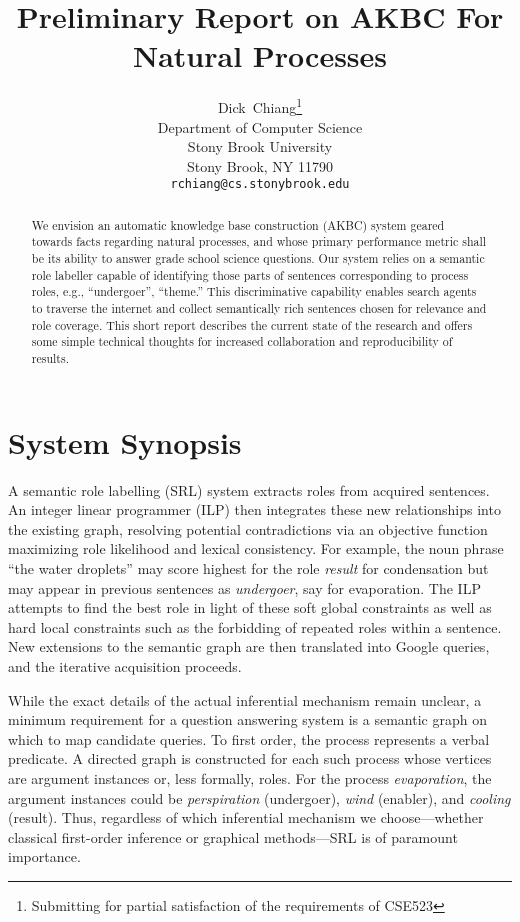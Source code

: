 \documentclass{article} %
\title{Preliminary Report on AKBC For Natural Processes}
\author{
Dick~Chiang\thanks{Submitting for partial satisfaction of the requirements of CSE523}\\
Department of Computer Science\\
Stony Brook University\\
Stony Brook, NY 11790 \\
\texttt{rchiang@cs.stonybrook.edu} \\
}
\begin{document}
\maketitle

\begin{abstract}
We envision an automatic knowledge base construction (AKBC) system geared towards facts regarding natural processes, and whose primary performance metric shall be its ability to answer grade school science questions.  Our system relies on a semantic role labeller capable of identifying those parts of sentences corresponding to process roles, e.g., ``undergoer'', ``theme.''  This discriminative capability enables search agents to traverse the internet and collect semantically rich sentences chosen for relevance and role coverage.  This short report describes the current state of the research and offers some simple technical thoughts for increased collaboration and reproducibility of results.
\end{abstract}

\section{System Synopsis}
A semantic role labelling (SRL) system extracts roles from acquired sentences.  An integer linear programmer (ILP) then integrates these new relationships into the existing graph, resolving potential contradictions via an objective function maximizing role likelihood and lexical consistency.  For example, the noun phrase ``the water droplets'' may score highest for the role {\it result} for condensation but may appear in previous sentences as {\it undergoer}, say for evaporation.   The ILP attempts to find the best role in light of these soft global constraints as well as hard local constraints such as the forbidding of repeated roles within a sentence.  New extensions to the semantic graph are then translated into Google queries, and the iterative acquisition proceeds.

While the exact details of the actual inferential mechanism remain unclear, a minimum requirement for a question answering system is a semantic graph on which to map candidate queries.  To first order, the process represents a verbal predicate.  A directed graph is constructed for each such process whose vertices are argument instances or, less formally, roles.  For the process {\it evaporation}, the argument instances could be {\it perspiration} (undergoer), {\it wind} (enabler), and {\it cooling} (result).  Thus, regardless of which inferential mechanism we choose---whether classical first-order inference or graphical methods---SRL is of paramount importance.
\end{document}
